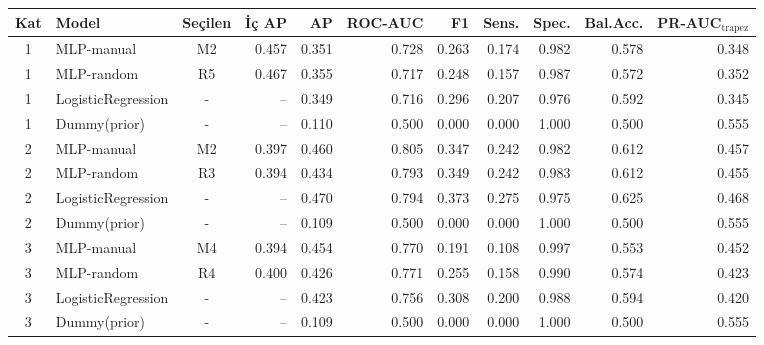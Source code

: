 \begin{tabular}{c l c r r r r r r r r}\toprule
Kat & Model & Seçilen & İç AP & AP & ROC-AUC & F1 & Sens. & Spec. & Bal.Acc. & PR-AUC$_{\mathrm{trapez}}$ \\\midrule
1 & MLP-manual & M2 & 0.457 & 0.351 & 0.728 & 0.263 & 0.174 & 0.982 & 0.578 & 0.348 \\
1 & MLP-random & R5 & 0.467 & 0.355 & 0.717 & 0.248 & 0.157 & 0.987 & 0.572 & 0.352 \\
1 & LogisticRegression & - & -- & 0.349 & 0.716 & 0.296 & 0.207 & 0.976 & 0.592 & 0.345 \\
1 & Dummy(prior) & - & -- & 0.110 & 0.500 & 0.000 & 0.000 & 1.000 & 0.500 & 0.555 \\
\midrule
2 & MLP-manual & M2 & 0.397 & 0.460 & 0.805 & 0.347 & 0.242 & 0.982 & 0.612 & 0.457 \\
2 & MLP-random & R3 & 0.394 & 0.434 & 0.793 & 0.349 & 0.242 & 0.983 & 0.612 & 0.455 \\
2 & LogisticRegression & - & -- & 0.470 & 0.794 & 0.373 & 0.275 & 0.975 & 0.625 & 0.468 \\
2 & Dummy(prior) & - & -- & 0.109 & 0.500 & 0.000 & 0.000 & 1.000 & 0.500 & 0.555 \\
\midrule
3 & MLP-manual & M4 & 0.394 & 0.454 & 0.770 & 0.191 & 0.108 & 0.997 & 0.553 & 0.452 \\
3 & MLP-random & R4 & 0.400 & 0.426 & 0.771 & 0.255 & 0.158 & 0.990 & 0.574 & 0.423 \\
3 & LogisticRegression & - & -- & 0.423 & 0.756 & 0.308 & 0.200 & 0.988 & 0.594 & 0.420 \\
3 & Dummy(prior) & - & -- & 0.109 & 0.500 & 0.000 & 0.000 & 1.000 & 0.500 & 0.555 \\
\bottomrule\end{tabular}